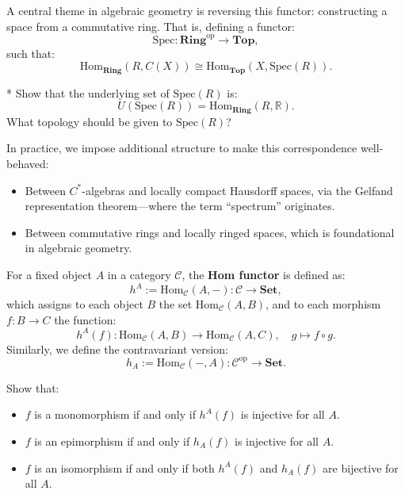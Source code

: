 \begin{remark}
A central theme in algebraic geometry is reversing this functor: constructing a space from a commutative ring. That is, defining a functor:
\[
\mathrm{Spec}: \mathbf{Ring}^{\mathrm{op}} \to \mathbf{Top},
\]
such that:
\[
\mathrm{Hom}_{\mathbf{Ring}}(R, C(X)) \cong \mathrm{Hom}_{\mathbf{Top}}(X, \mathrm{Spec}(R)).
\]

\begin{exercise}*
Show that the underlying set of $\mathrm{Spec}(R)$ is:
\[
U(\mathrm{Spec}(R)) = \mathrm{Hom}_{\mathbf{Ring}}(R, \mathbb{R} ).
\]
What topology should be given to $\mathrm{Spec}(R)$?
\end{exercise}

In practice, we impose additional structure to make this correspondence well-behaved:
\begin{itemize}
    \item Between $C^*$-algebras and locally compact Hausdorff spaces, via the Gelfand representation theorem—where the term “spectrum” originates.
    \item Between commutative rings and locally ringed spaces, which is foundational in algebraic geometry.
\end{itemize}
\end{remark}

\begin{example}
For a fixed object $A$ in a category $\mathcal{C}$, the \textbf{Hom functor} is defined as:
\[
h^A := \mathrm{Hom}_{\mathcal{C}}(A, -): \mathcal{C} \to \mathbf{Set},
\]
which assigns to each object $B$ the set $\mathrm{Hom}_{\mathcal{C}}(A, B)$, and to each morphism $f: B \to C$ the function:
\[
h^A(f): \mathrm{Hom}_{\mathcal{C}}(A, B) \to \mathrm{Hom}_{\mathcal{C}}(A, C), \quad g \mapsto f \circ g.
\]
Similarly, we define the contravariant version:
\[
h_A := \mathrm{Hom}_{\mathcal{C}}(-, A): \mathcal{C}^{\mathrm{op}} \to \mathbf{Set}.
\]
\end{example}

\begin{exercise}
Show that:
\begin{itemize}
    \item $f$ is a monomorphism if and only if $h^A(f)$ is injective for all $A$.
    \item $f$ is an epimorphism if and only if $h_A(f)$ is injective for all $A$.
    \item $f$ is an isomorphism if and only if both $h^A(f)$ and $h_A(f)$ are bijective for all $A$.
\end{itemize}
\end{exercise}

